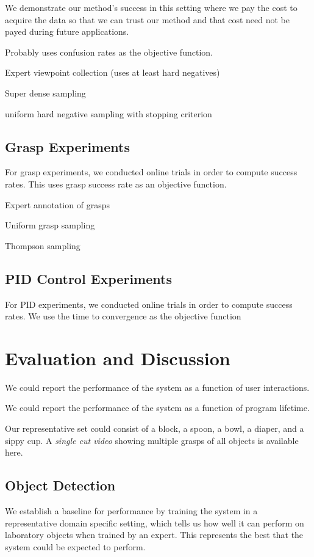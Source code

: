 \documentclass[conference]{IEEEtran}
\begin{document}
We demonstrate our method's success in this setting where we pay the cost
to acquire the data so that we can trust our method and that cost need not be 
payed during future applications. 

Probably uses confusion rates as the objective function.

Expert viewpoint collection (uses at least hard negatives)

Super dense sampling

uniform hard negative sampling with stopping criterion

\subsection{Grasp Experiments}
For grasp experiments, we conducted online trials in order to compute success rates.
This uses grasp success rate as an objective function.

Expert annotation of grasps

Uniform grasp sampling

Thompson sampling

\subsection{PID Control Experiments}
For PID experiments, we conducted online trials in order to compute success rates.
We use the time to convergence as the objective function




\section{Evaluation and Discussion}
We could report the performance of the system as a function of user interactions.

We could report the performance of the system as a function of program lifetime.

Our representative set could consist of a block, a spoon,
a bowl, a diaper, and a sippy cup. A \emph{single cut video} showing multiple grasps
of all objects is available here.

\subsection{Object Detection}
We establish a baseline for performance by training the system in a representative domain
specific setting, which tells us how well it can perform on laboratory objects when trained by an 
expert. This represents the best that the system could be expected to perform.
\end{document}
